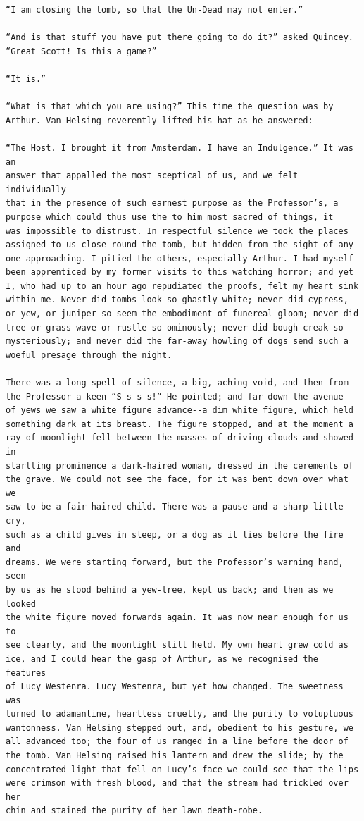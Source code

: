 \documentclass{article}
\begin{document}
\begin{verbatim}
“I am closing the tomb, so that the Un-Dead may not enter.”

“And is that stuff you have put there going to do it?” asked Quincey.
“Great Scott! Is this a game?”

“It is.”

“What is that which you are using?” This time the question was by
Arthur. Van Helsing reverently lifted his hat as he answered:--

“The Host. I brought it from Amsterdam. I have an Indulgence.” It was an
answer that appalled the most sceptical of us, and we felt individually
that in the presence of such earnest purpose as the Professor’s, a
purpose which could thus use the to him most sacred of things, it
was impossible to distrust. In respectful silence we took the places
assigned to us close round the tomb, but hidden from the sight of any
one approaching. I pitied the others, especially Arthur. I had myself
been apprenticed by my former visits to this watching horror; and yet
I, who had up to an hour ago repudiated the proofs, felt my heart sink
within me. Never did tombs look so ghastly white; never did cypress,
or yew, or juniper so seem the embodiment of funereal gloom; never did
tree or grass wave or rustle so ominously; never did bough creak so
mysteriously; and never did the far-away howling of dogs send such a
woeful presage through the night.

There was a long spell of silence, a big, aching void, and then from
the Professor a keen “S-s-s-s!” He pointed; and far down the avenue
of yews we saw a white figure advance--a dim white figure, which held
something dark at its breast. The figure stopped, and at the moment a
ray of moonlight fell between the masses of driving clouds and showed in
startling prominence a dark-haired woman, dressed in the cerements of
the grave. We could not see the face, for it was bent down over what we
saw to be a fair-haired child. There was a pause and a sharp little cry,
such as a child gives in sleep, or a dog as it lies before the fire and
dreams. We were starting forward, but the Professor’s warning hand, seen
by us as he stood behind a yew-tree, kept us back; and then as we looked
the white figure moved forwards again. It was now near enough for us to
see clearly, and the moonlight still held. My own heart grew cold as
ice, and I could hear the gasp of Arthur, as we recognised the features
of Lucy Westenra. Lucy Westenra, but yet how changed. The sweetness was
turned to adamantine, heartless cruelty, and the purity to voluptuous
wantonness. Van Helsing stepped out, and, obedient to his gesture, we
all advanced too; the four of us ranged in a line before the door of
the tomb. Van Helsing raised his lantern and drew the slide; by the
concentrated light that fell on Lucy’s face we could see that the lips
were crimson with fresh blood, and that the stream had trickled over her
chin and stained the purity of her lawn death-robe.


\end{verbatim}
\end{document}
